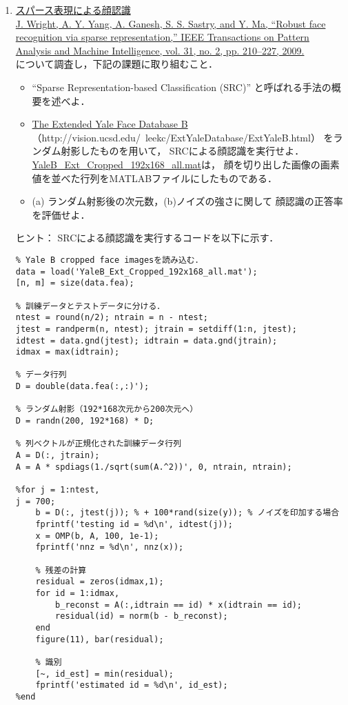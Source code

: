 \begin{enumerate}
\item\yeeks
\href{http://perception.csl.illinois.edu/recognition/Home.html}{スパース表現による顔認識}\cite{Wright09}\\
\href{http://www.columbia.edu/~jw2966/Wright09-PAMI.pdf}{J. Wright, A. Y. Yang, A. Ganesh, S. S. Sastry, and Y. Ma, ``Robust face recognition via sparse representation,'' IEEE Transactions on Pattern Analysis and Machine Intelligence, vol. 31, no. 2, pp. 210--227, 2009.}\\
について調査し，下記の課題に取り組むこと．
\begin{itemize}
\item ``Sparse Representation-based Classification (SRC)''
と呼ばれる手法の概要を述べよ．
\item 
\href{http://vision.ucsd.edu/~leekc/ExtYaleDatabase/ExtYaleB.html}{The Extended Yale Face Database B}\\
（http://vision.ucsd.edu/~leekc/ExtYaleDatabase/ExtYaleB.html）
をランダム射影したものを用いて，
SRCによる顔認識を実行せよ．
\href{https://drive.google.com/file/d/0Bx4bEpaTSFcgRm15NVlua1pOTWM}{YaleB\_Ext\_Cropped\_192x168\_all.mat}は，
顔を切り出した画像の画素値を並べた行列をMATLABファイルにしたものである．

\item (a) ランダム射影後の次元数，(b)ノイズの強さに関して
顔認識の正答率を評価せよ．
\end{itemize}
ヒント：
SRCによる顔認識を実行するコードを以下に示す．
\begin{lstlisting}
% Yale B cropped face imagesを読み込む．
data = load('YaleB_Ext_Cropped_192x168_all.mat');
[n, m] = size(data.fea);

% 訓練データとテストデータに分ける．
ntest = round(n/2); ntrain = n - ntest;
jtest = randperm(n, ntest); jtrain = setdiff(1:n, jtest);
idtest = data.gnd(jtest); idtrain = data.gnd(jtrain);
idmax = max(idtrain);

% データ行列
D = double(data.fea(:,:)');

% ランダム射影（192*168次元から200次元へ）
D = randn(200, 192*168) * D;

% 列ベクトルが正規化された訓練データ行列
A = D(:, jtrain);
A = A * spdiags(1./sqrt(sum(A.^2))', 0, ntrain, ntrain);

%for j = 1:ntest,
j = 700;
    b = D(:, jtest(j)); % + 100*rand(size(y)); % ノイズを印加する場合
    fprintf('testing id = %d\n', idtest(j));
    x = OMP(b, A, 100, 1e-1);
    fprintf('nnz = %d\n', nnz(x));

    % 残差の計算
    residual = zeros(idmax,1);
    for id = 1:idmax,
        b_reconst = A(:,idtrain == id) * x(idtrain == id);
        residual(id) = norm(b - b_reconst);
    end
    figure(11), bar(residual);

    % 識別
    [~, id_est] = min(residual);
    fprintf('estimated id = %d\n', id_est);
%end
\end{lstlisting}



\end{enumerate}




{\footnotesize

}

